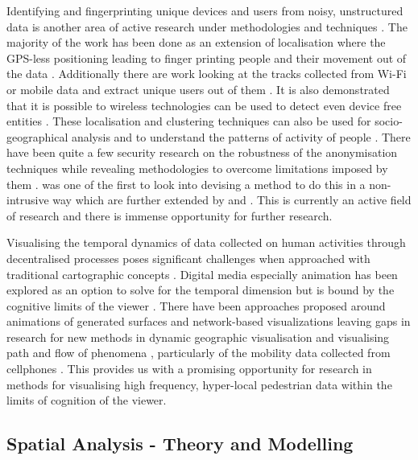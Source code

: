 Identifying and fingerprinting unique devices and users from noisy, unstructured data is another area of active research under methodologies and techniques \citep{jiang2006, liao2006}.
The majority of the work has been done as an extension of localisation where the GPS-less positioning leading to finger printing people and their movement out of the data \citep{pang2007a, pappalardo2015}.
Additionally there are work looking at the tracks collected from Wi-Fi or mobile data and extract unique users out of them \citep{girardin2008, eagle2009, jiang2012}.
It is also demonstrated that it is possible to wireless technologies can be used to detect even device free entities \citep{elgohary2013}.
These localisation and clustering techniques can also be used for socio-geographical analysis and to understand the patterns of activity of people \citep{licoppe2008}.
There have been quite a few security research on the robustness of the anonymisation techniques while revealing methodologies to overcome limitations imposed by them \citep{mathieucunche2016, chothia2010, krumm2007}.
\citet{cheng2016} was one of the first to look into devising a method to do this in a non-intrusive way which are further extended by \citet{di2016, adamsky2018} and \citet{dai2019}.
This is currently an active field of research and there is immense opportunity for further research.

Visualising the temporal dynamics of data collected on human activities through decentralised processes poses significant challenges when approached with traditional cartographic concepts \citep{maceachren2001, hallisey2005}.
Digital media especially animation has been explored as an option to solve for the temporal dimension \citep{morrison2000, lobben2003} but is bound by the cognitive limits of the viewer \citep{harrower2007}.
There have been approaches proposed around animations of generated surfaces \citep{kobayashi2011} and network-based visualizations \citep{ferrara2014} leaving gaps in research for new methods in dynamic geographic visualisation \citep{fabrikant2005} and visualising path and flow of phenomena \citep{thomas2005}, particularly of the mobility data collected from cellphones \citep{sbodio2014}.
This provides us with a promising opportunity for research in methods for visualising high frequency, hyper-local pedestrian data within the limits of cognition of the viewer.

\subsection{Spatial Analysis - Theory and Modelling}

